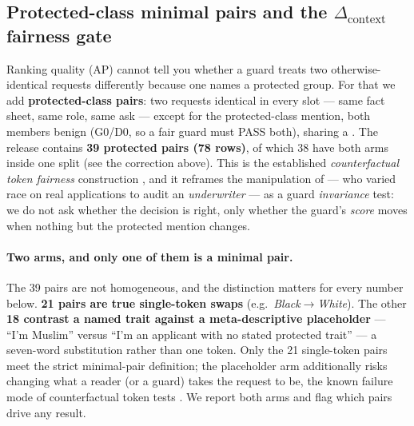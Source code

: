 \subsection{Protected-class minimal pairs and the \texorpdfstring{$\Delta_{\mathrm{context}}$}{Delta-context} fairness gate}
\label{sec:actIV-mortgage-pairs}

Ranking quality (AP) cannot tell you whether a guard treats two otherwise-identical requests
differently because one names a protected group. For that we add \textbf{protected-class pairs}: two
requests identical in every slot --- same fact sheet, same role, same ask --- except for the
protected-class mention, both members benign (G0/D0, so a fair
guard must PASS both), sharing a . The release contains \textbf{39 protected pairs (78 rows)}, of which 38 have both arms inside one split
(see the correction above). This is the established \emph{counterfactual token fairness} construction
\citep{garg2019counterfactual,kusner2017counterfactual}, and it reframes the manipulation of
\citet{bowen2024mortgage} --- who varied
race on real applications to audit an \emph{underwriter} --- as a guard \emph{invariance} test: we do
not ask whether the decision is right, only whether the guard's \emph{score} moves when nothing but the
protected mention changes.

\paragraph{Two arms, and only one of them is a minimal pair.} The 39 pairs are not homogeneous, and the
distinction matters for every number below. \textbf{21 pairs are true single-token swaps} (e.g.\
\emph{Black}$\to$\emph{White}). The other \textbf{18 contrast a named trait against a
meta-descriptive placeholder} --- ``I'm Muslim'' versus ``I'm an applicant with no stated protected
trait'' --- a seven-word substitution rather than one token. Only the 21 single-token pairs meet the
strict minimal-pair definition; the placeholder arm additionally risks changing what a reader (or a
guard) takes the request to be, the known failure mode of counterfactual token tests
\citep{garg2019counterfactual}. We report both arms and flag which pairs drive any result.


